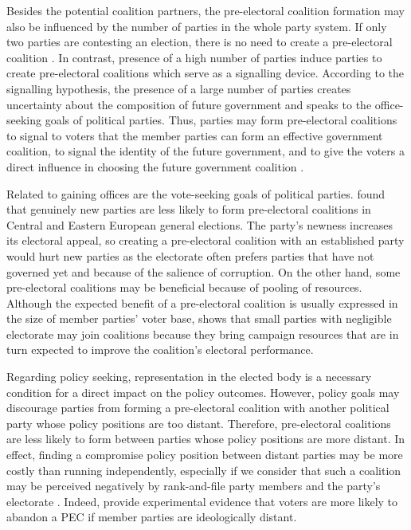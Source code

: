 \documentclass[fignum,12pt,titlepage]{article}
\begin{document}
Besides the potential coalition partners, the pre-electoral coalition formation may also be influenced by the number of parties in the whole party system. 
If only two parties are contesting an election, there is no need to create a pre-electoral coalition \parencite{golder2005}. In contrast, presence of a high number of parties induce parties to create pre-electoral coalitions which serve as a signalling device. According to the signalling hypothesis, the presence of a large number of parties creates uncertainty about the composition of future government and speaks to the office-seeking goals of political parties. Thus, parties may form pre-electoral coalitions to signal to voters that the member parties can form an effective government coalition, to signal the identity of the future government, and to give the voters a direct influence in choosing the future government coalition \parencite{golder2005}.

Related to gaining offices are the vote-seeking goals of political parties. \textcite{ibenskas2016} found that genuinely new parties are less likely to form pre-electoral coalitions in Central and Eastern European general elections. The party's newness increases its electoral appeal, so creating a pre-electoral coalition with an established party would hurt new parties as the electorate often prefers parties that have not governed yet and because of the salience of corruption. On the other hand, some pre-electoral coalitions may be beneficial because of pooling of resources. Although the expected benefit of a pre-electoral coalition is usually expressed in the size of member parties' voter base, \textcite{silva2022} shows that small parties with negligible electorate may join coalitions because they bring campaign resources that are in turn expected to improve the coalition's electoral performance.

Regarding policy seeking, representation in the elected body is a necessary condition for a direct impact on the policy outcomes. However, policy goals may discourage parties from forming a pre-electoral coalition with another political party whose policy positions are too distant. Therefore, pre-electoral coalitions are less likely to form between parties whose policy positions are more distant. In effect, finding a compromise policy position between distant parties may be more costly than running independently, especially if we consider that such a coalition may be perceived negatively by rank-and-file party members and the party's electorate \parencite[198]{golder2006b}. 
Indeed, \textcite{gschwend2008} provide experimental evidence that voters are more likely to abandon a PEC if member parties are ideologically distant.
\end{document}
